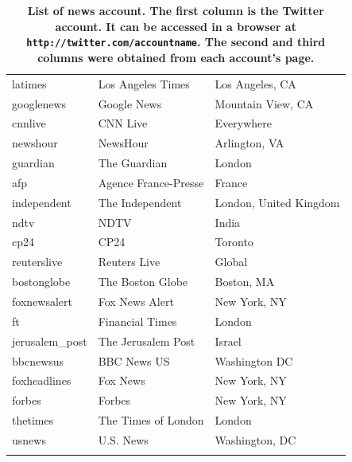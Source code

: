 {\begin{longtable}{lll}
    latimes          &  Los Angeles Times     &  Los Angeles, CA             \\
    googlenews       &  Google News           &  Mountain View, CA           \\
    cnnlive          &  CNN Live              &  Everywhere                  \\
    newshour         &  NewsHour              &  Arlington, VA               \\
    guardian         &  The Guardian          &  London                      \\
    afp              &  Agence France-Presse  &  France                      \\
    independent      &  The Independent       &  London, United Kingdom      \\
    ndtv             &  NDTV                  &  India                       \\
    cp24             &  CP24                  &  Toronto                     \\
    reuterslive      &  Reuters Live          &  Global                      \\
    bostonglobe      &  The Boston Globe      &  Boston, MA                  \\
    foxnewsalert     &  Fox News Alert        &  New York, NY                \\
    ft               &  Financial Times       &  London                      \\
    jerusalem\_post   &  The Jerusalem Post    &  Israel                      \\
    bbcnewsus        &  BBC News US           &  Washington DC               \\
    foxheadlines     &  Fox News              &  New York, NY                \\
    forbes           &  Forbes                &  New York, NY                \\
    thetimes         &  The Times of London   &  London                      \\
    usnews           &  U.S. News             &  Washington, DC\\

    \caption[List of news accounts.]{\textbf{List of news account. The
        first column is the Twitter account. It can be accessed in a
        browser at \texttt{http://twitter.com/accountname}. The second
        and third columns were obtained from each account's page.}}
    \label{table:acct_names}
\end{longtable}
}

